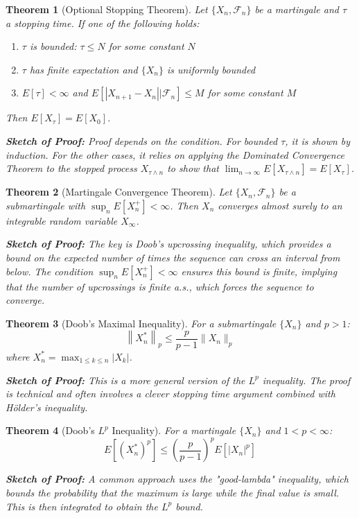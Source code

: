 \documentclass[12pt,a4paper]{article}
\newtheorem{theorem}{Theorem}[section]
\theoremstyle{remark}
\begin{document}
\begin{theorem}[Optional Stopping Theorem]
Let $\{X_n, \mathcal{F}_n\}$ be a martingale and $\tau$ a stopping time. If one of the following holds:
\begin{enumerate}
\item $\tau$ is bounded: $\tau \leq N$ for some constant $N$
\item $\tau$ has finite expectation and $\{X_n\}$ is uniformly bounded
\item $E[\tau] < \infty$ and $E[|X_{n+1} - X_n||\mathcal{F}_n] \leq M$ for some constant $M$
\end{enumerate}
Then $E[X_\tau] = E[X_0]$.

\textbf{Sketch of Proof:} Proof depends on the condition. For bounded $\tau$, it is shown by induction. For the other cases, it relies on applying the Dominated Convergence Theorem to the stopped process $X_{\tau \wedge n}$ to show that $\lim_{n \to \infty} E[X_{\tau \wedge n}] = E[X_\tau]$.
\end{theorem}

\begin{theorem}[Martingale Convergence Theorem]
Let $\{X_n, \mathcal{F}_n\}$ be a submartingale with $\sup_n E[X_n^+] < \infty$. Then $X_n$ converges almost surely to an integrable random variable $X_\infty$.

\textbf{Sketch of Proof:} The key is Doob's upcrossing inequality, which provides a bound on the expected number of times the sequence can cross an interval from below. The condition $\sup_n E[X_n^+] < \infty$ ensures this bound is finite, implying that the number of upcrossings is finite a.s., which forces the sequence to converge.
\end{theorem}

\begin{theorem}[Doob's Maximal Inequality]
For a submartingale $\{X_n\}$ and $p > 1$:
$$\left\|X_n^*\right\|_p \leq \frac{p}{p-1} \|X_n\|_p$$
where $X_n^* = \max_{1 \leq k \leq n} |X_k|$.

\textbf{Sketch of Proof:} This is a more general version of the $L^p$ inequality. The proof is technical and often involves a clever stopping time argument combined with Hölder's inequality.
\end{theorem}

\begin{theorem}[Doob's $L^p$ Inequality]
For a martingale $\{X_n\}$ and $1 < p < \infty$:
$$E[(X_n^*)^p] \leq \left(\frac{p}{p-1}\right)^p E[|X_n|^p]$$

\textbf{Sketch of Proof:} A common approach uses the "good-lambda" inequality, which bounds the probability that the maximum is large while the final value is small. This is then integrated to obtain the $L^p$ bound.
\end{theorem}
\end{document}
